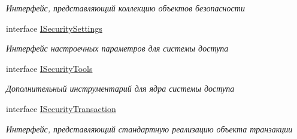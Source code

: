 \begin{DoxyCompactItemize}
\begin{DoxyCompactList}\small\item\em Интерфейс, представляющий коллекцию объектов безопасности \end{DoxyCompactList}\item 
interface \hyperlink{interface_security_1_1_interfaces_1_1_i_security_settings}{I\+Security\+Settings}
\begin{DoxyCompactList}\small\item\em Интерфейс настроечных параметров для системы доступа \end{DoxyCompactList}\item 
interface \hyperlink{interface_security_1_1_interfaces_1_1_i_security_tools}{I\+Security\+Tools}
\begin{DoxyCompactList}\small\item\em Дополнительный инструментарий для ядра системы доступа \end{DoxyCompactList}\item 
interface \hyperlink{interface_security_1_1_interfaces_1_1_i_security_transaction}{I\+Security\+Transaction}
\begin{DoxyCompactList}\small\item\em Интерфейс, представляющий стандартную реализацию объекта транзакции \end{DoxyCompactList}\end{DoxyCompactItemize}
